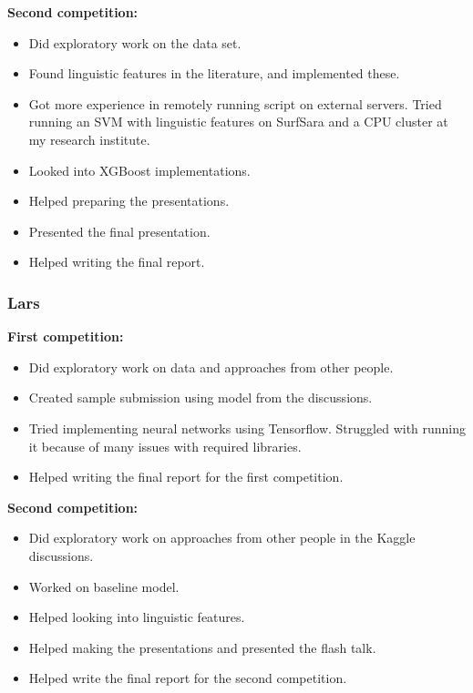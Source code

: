 \documentclass[a4paper]{article}
\begin{document}
\noindent\textbf{Second competition:}

\begin{itemize}
	\item Did exploratory work on the data set.
	\item Found linguistic features in the literature, and implemented these.
	\item Got more experience in remotely running script on external servers. Tried running an SVM with linguistic features on SurfSara and a CPU cluster at my research institute. 
	\item Looked into XGBoost implementations.
	\item Helped preparing the presentations.
	\item Presented the final presentation.
	\item Helped writing the final report.
\end{itemize}


\subsubsection*{Lars}

\textbf{First competition:}

\begin{itemize}
	\item Did exploratory work on data and approaches from other people.
	\item Created sample submission using model from the discussions.
	\item Tried implementing neural networks using Tensorflow. Struggled with running it because of many issues with required libraries.
	\item Helped writing the final report for the first competition.
\end{itemize}


\noindent\textbf{Second competition:}

\begin{itemize}
	\item Did exploratory work on approaches from other people in the Kaggle discussions.
	\item Worked on baseline model.
	\item Helped looking into linguistic features.
	\item Helped making the presentations and presented the flash talk.
	\item Helped write the final report for the second competition.
\end{itemize}
\end{document}
